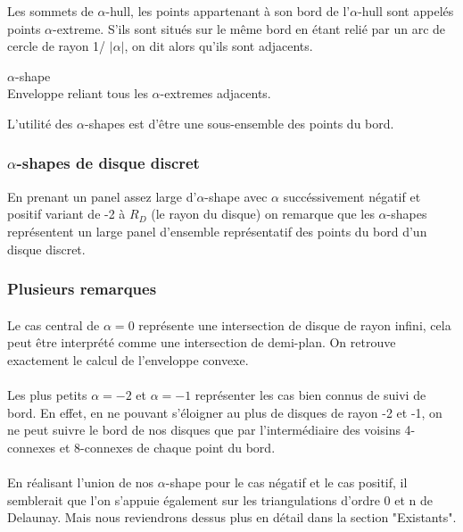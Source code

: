 
Les sommets de $\alpha$-hull, les points appartenant à son bord de l'$\alpha$-hull sont appelés points $\alpha$-extreme. S'ils sont situés sur le même bord en étant relié par un arc de cercle de rayon 1/ $\lvert \alpha \rvert$, on dit alors qu'ils sont adjacents.

\begin{Definition}{$\alpha$-shape}\\
\label{def:as}
      Enveloppe reliant tous les $\alpha$-extremes adjacents.
\end{Definition}


L'utilité des $\alpha$-shapes est d'être une sous-ensemble des points du bord. 

\subsubsection{$\alpha$-shapes de disque discret}

En prenant un panel assez large d'$\alpha$-shape avec $\alpha$ succéssivement négatif et positif variant de -2 à $R_D$ (le rayon du disque) on remarque que les $\alpha$-shapes représentent un large panel d'ensemble représentatif des points du bord d'un disque discret.


\subsubsection{Plusieurs remarques}

\paragraph{}
Le cas central de $\alpha = 0$ représente une intersection de disque de rayon infini, cela peut être interprété comme une intersection de demi-plan. On retrouve exactement le calcul de l'enveloppe convexe.

\paragraph{}
Les plus petits $\alpha = -2$ et $\alpha = -1$ représenter les cas bien connus de suivi de bord. En effet, en ne pouvant s'éloigner au plus de disques de rayon -2 et -1, on ne peut suivre le bord de nos disques que par l'intermédiaire des voisins 4-connexes et 8-connexes de chaque point du bord.

\paragraph{}
En réalisant l'union de nos $\alpha$-shape pour le cas négatif et le cas positif, il semblerait que l'on s'appuie également sur les triangulations d'ordre 0 et n de Delaunay. Mais nous reviendrons dessus plus en détail dans la section "Existants".\\


